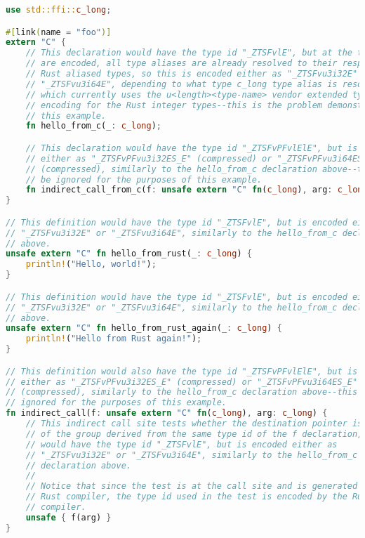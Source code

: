 \documentclass{article}
\begin{document}
\begin{lstlisting}[language=Rust, caption={Example Rust program using Rust integer types and the Rust compiler encoding.}]
use std::ffi::c_long;

#[link(name = "foo")]
extern "C" {
    // This declaration would have the type id "_ZTSFvlE", but at the time types
    // are encoded, all type aliases are already resolved to their respective
    // Rust aliased types, so this is encoded either as "_ZTSFvu3i32E" or
    // "_ZTSFvu3i64E", depending to what type c_long type alias is resolved to,
    // which currently uses the u<length><type-name> vendor extended type
    // encoding for the Rust integer types--this is the problem demonstrated in
    // this example.
    fn hello_from_c(_: c_long);

    // This declaration would have the type id "_ZTSFvPFvlElE", but is encoded
    // either as "_ZTSFvPFvu3i32ES_E" (compressed) or "_ZTSFvPFvu3i64ES_E"
    // (compressed), similarly to the hello_from_c declaration above--this can
    // be ignored for the purposes of this example.
    fn indirect_call_from_c(f: unsafe extern "C" fn(c_long), arg: c_long);
}

// This definition would have the type id "_ZTSFvlE", but is encoded either as
// "_ZTSFvu3i32E" or "_ZTSFvu3i64E", similarly to the hello_from_c declaration
// above.
unsafe extern "C" fn hello_from_rust(_: c_long) {
    println!("Hello, world!");
}

// This definition would have the type id "_ZTSFvlE", but is encoded either as
// "_ZTSFvu3i32E" or "_ZTSFvu3i64E", similarly to the hello_from_c declaration
// above.
unsafe extern "C" fn hello_from_rust_again(_: c_long) {
    println!("Hello from Rust again!");
}

// This definition would also have the type id "_ZTSFvPFvlElE", but is encoded
// either as "_ZTSFvPFvu3i32ES_E" (compressed) or "_ZTSFvPFvu3i64ES_E"
// (compressed), similarly to the hello_from_c declaration above--this can be
// ignored for the purposes of this example.
fn indirect_call(f: unsafe extern "C" fn(c_long), arg: c_long) {
    // This indirect call site tests whether the destination pointer is a member
    // of the group derived from the same type id of the f declaration, which
    // would have the type id "_ZTSFvlE", but is encoded either as
    // "_ZTSFvu3i32E" or "_ZTSFvu3i64E", similarly to the hello_from_c
    // declaration above.
    //
    // Notice that since the test is at the call site and is generated by the
    // Rust compiler, the type id used in the test is encoded by the Rust
    // compiler.
    unsafe { f(arg) }
}


\end{lstlisting}
\end{document}
